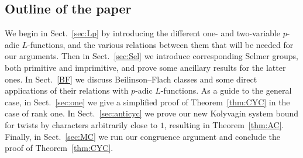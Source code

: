 \documentclass[a4paper,10pt]{amsart}
\numberwithin{equation}{section}
\numberwithin{equation}{section}
\theoremstyle{plain}
\theoremstyle{definition}
\theoremstyle{definition}
\theoremstyle{plain}
\theoremstyle{plain}
\theoremstyle{plain}
\theoremstyle{plain}
\newcommand{\Q}{\mathbb{Q}}
\begin{document}

\subsection{Outline of the paper}

We begin in Sect.~\ref{sec:Lp} by introducing the different one- and two-variable 
$p$-adic $L$-functions, and the various relations between them that will be needed for our arguments. Then in Sect.~\ref{sec:Sel} we introduce corresponding Selmer groups, both primitive and imprimitive, and prove some ancillary results for the latter ones. In Sect.~\ref{BF} we discuss Beilinson--Flach classes and some direct applications of their relations with $p$-adic $L$-functions. As a guide to the general case, 
in Sect.~\ref{sec:one} we give a simplified proof of Theorem~\ref{thm:CYC} in the case of rank one.  
In Sect.~\ref{sec:anticyc}
we prove our new Kolyvagin system bound for twists by characters arbitrarily close to $1$, resulting in Theorem~\ref{thm:AC}.
Finally, in Sect.~\ref{sec:MC} we run our congruence argument and conclude the proof of Theorem~\ref{thm:CYC}.

\end{document}
